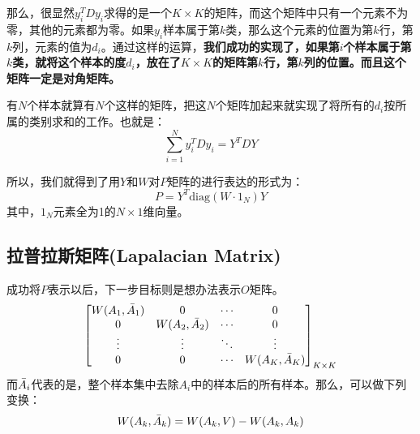 \documentclass[a4paper]{article}
\begin{document}
那么，很显然$y_i^T D y_i$求得的是一个$K\times K$的矩阵，而这个矩阵中只有一个元素不为零，其他的元素都为零。如果$y_i$样本属于第$k$类，那么这个元素的位置为第$k$行，第$k$列，元素的值为$d_i$。通过这样的运算，\textbf{我们成功的实现了，如果第$i$个样本属于第$k$类，就将这个样本的度$d_i$，放在了$K \times K$的矩阵第$k$行，第$k$列的位置。而且这个矩阵一定是对角矩阵。}

有$N$个样本就算有$N$个这样的矩阵，把这$N$个矩阵加起来就实现了将所有的$d_i$按所属的类别求和的工作。也就是：
\begin{equation}
    \sum_{i=1}^N y_i^T D y_i = Y^TDY
\end{equation}

所以，我们就得到了用$Y$和$W$对$P$矩阵的进行表达的形式为：
\begin{equation}
    P = Y^T\mathrm{diag}(W\cdot 1_N)Y
\end{equation}
其中，$1_N$元素全为1的$N\times1$维向量。

\subsection{拉普拉斯矩阵(Lapalacian Matrix)}
成功将$P$表示以后，下一步目标则是想办法表示$O$矩阵。
\begin{equation}
    \begin{bmatrix}
    { W(A_1,\Bar{A}_1)} & 0 & \cdots & 0 \\
    0 &  W(A_2,\Bar{A}_2) &   \cdots & 0 \\
    \vdots & \vdots & \ddots & \vdots \\
    0 & 0  &   \cdots & { W(A_K,\Bar{A}_K)} \\
    \end{bmatrix}_{K\times K}
\end{equation}
而$\Bar{A}_i$代表的是，整个样本集中去除$A_i$中的样本后的所有样本。那么，可以做下列变换：
\begin{equation}
    W(A_k,\Bar{A}_k) = W(A_k,V) - W(A_k,A_k)
\end{equation}
\end{document}
